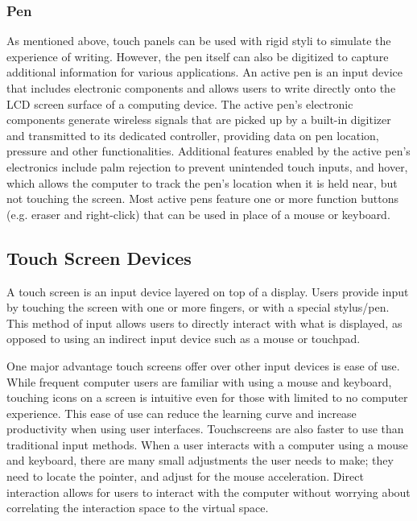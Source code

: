 \documentclass[11pt]{report}
\begin{document}
 \subsubsection{Pen}
 
 As mentioned above, touch panels can be used with rigid styli to simulate the experience of writing. 
 However, the pen itself can also be digitized to capture additional information for various applications. 
 An active pen is an input device that includes electronic components and allows users to write directly onto the LCD screen surface of a computing device.
 The active pen's electronic components generate wireless signals that are picked up by a built-in digitizer and transmitted to its dedicated controller, providing data on pen location, pressure and other functionalities. 
 Additional features enabled by the active pen's electronics include palm rejection to prevent unintended touch inputs, and hover, which allows the computer to track the pen's location when it is held near, but not touching the screen. 
 Most active pens feature one or more function buttons (e.g. eraser and right-click) that can be used in place of a mouse or keyboard.

\subsection{Touch Screen Devices}

A touch screen is an input device layered on top of a display. 
Users provide input by touching the screen with one or more fingers, or with a special stylus/pen.
This method of input allows users to directly interact with what is displayed, as opposed to using an indirect input device such as a mouse or touchpad.

One major advantage touch screens offer over other input devices is ease of use.
While frequent computer users are familiar with using a mouse and keyboard, touching icons on a screen is intuitive even for those with limited to no computer experience.
This ease of use can reduce the learning curve and increase productivity when using user interfaces.
Touchscreens are also faster to use than traditional input methods.
When a user interacts with a computer using a mouse and keyboard, there are many small adjustments the user needs to make; they need to locate the pointer, and adjust for the mouse acceleration.
Direct interaction allows for users to interact with the computer without worrying about correlating the interaction space to the virtual space. 
\end{document}
